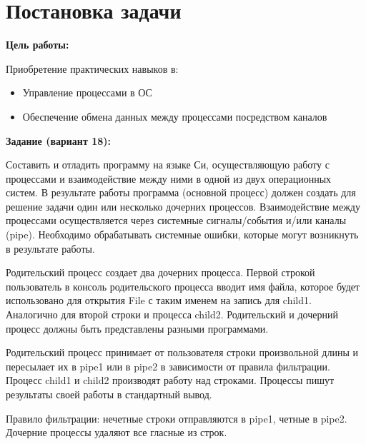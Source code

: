 \section{Постановка задачи}

{\bfseries Цель работы:} 

Приобретение практических навыков в:

\begin{itemize}
    \item Управление процессами в ОС
    \item Обеспечение обмена данных между процессами посредством каналов
\end{itemize}

{\bfseries Задание (вариант 18):} 

Составить и отладить программу на языке Си, осуществляющую работу с процессами и взаимодействие между ними в одной из двух операционных систем. В результате работы программа (основной процесс) должен создать для решение задачи один или несколько дочерних процессов. Взаимодействие между процессами осуществляется через системные сигналы/события и/или каналы (pipe). Необходимо обрабатывать системные ошибки, которые могут возникнуть в результате работы.

Родительский процесс создает два дочерних процесса. Первой строкой пользователь в консоль родительского процесса вводит имя файла, которое будет использовано для открытия File с таким именем на запись для child1. Аналогично для второй строки и процесса child2. Родительский и дочерний процесс должны быть представлены разными программами.

Родительский процесс принимает от пользователя строки произвольной длины и пересылает их в pipe1 или в pipe2 в зависимости от правила фильтрации. Процесс child1 и child2 производят работу над строками. Процессы пишут результаты своей работы в стандартный вывод.

Правило фильтрации: нечетные строки отправляются в pipe1, четные в pipe2. Дочерние процессы удаляют все гласные из строк.

\pagebreak
